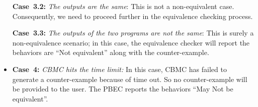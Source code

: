 \begin{itemize}
{\textbf{Case~3.2:} \it The outputs are the same}: This is not a 
 non-equivalent case. Consequently, we need to proceed further in the 
 equivalence checking process. 

{\textbf{Case~3.3:} \it The outputs of the two 
 programs are not the same}: This is surely a non-equivalence scenario; 
 in this case, the equivalence checker will report the behaviors are ``Not 
 equivalent'' along with the counter-example.
 \item {\textbf{Case~4:} \it CBMC hits the time limit:} In this case, CBMC  
 has failed to generate a counter-example because of time out. 
 So no counter-example will be provided to the user. The PBEC reports the behaviors ``May Not be equivalent''. 
 \end{itemize}
